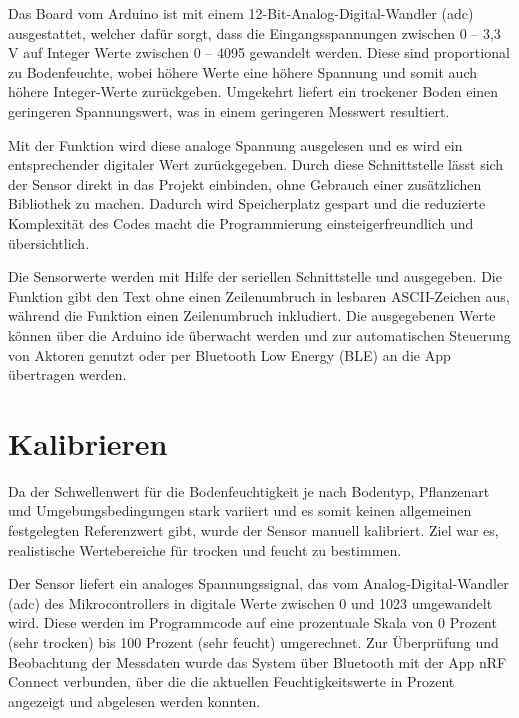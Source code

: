 			\vspace{1\baselineskip}

			Das Board vom Arduino ist mit einem 12-Bit-Analog-Digital-Wandler (\ac{adc}) ausgestattet, welcher dafür sorgt, dass die Eingangsspannungen zwischen 0 – 3,3 V auf Integer Werte zwischen 0 – 4095 gewandelt werden. Diese sind proportional zu Bodenfeuchte, wobei höhere Werte eine höhere Spannung und somit auch höhere Integer-Werte zurückgeben. Umgekehrt liefert ein trockener Boden einen geringeren Spannungswert, was in einem geringeren Messwert resultiert. \cite{Bartlett:2023}

			\vspace{1\baselineskip}

			Mit der Funktion  wird diese analoge Spannung ausgelesen und es wird ein entsprechender digitaler Wert zurückgegeben. Durch diese Schnittstelle lässt sich der Sensor direkt in das Projekt einbinden, ohne Gebrauch einer zusätzlichen Bibliothek zu machen. Dadurch wird Speicherplatz gespart und die reduzierte Komplexität des Codes macht die Programmierung einsteigerfreundlich und übersichtlich. \cite{Bartlett:2023}

			\vspace{1\baselineskip}

			Die Sensorwerte werden mit Hilfe der seriellen Schnittstelle  und  ausgegeben. Die Funktion  gibt den Text ohne einen Zeilenumbruch in lesbaren ASCII-Zeichen aus, während die Funktion  einen Zeilenumbruch inkludiert. Die ausgegebenen Werte können über die Arduino \ac{ide} überwacht werden und zur automatischen Steuerung von Aktoren genutzt oder per Bluetooth Low Energy (BLE) an die App übertragen werden.
			\cite{SunFounder:2025} \cite{Arduino:2024}


	\section{Kalibrieren}
		Da der Schwellenwert für die Bodenfeuchtigkeit je nach Bodentyp, Pflanzenart und Umgebungsbedingungen stark variiert und es somit keinen allgemeinen festgelegten Referenzwert gibt, wurde der Sensor manuell kalibriert. Ziel war es, realistische Wertebereiche für trocken und feucht zu bestimmen.
		
		\vspace{1\baselineskip}
		
		Der Sensor liefert ein analoges Spannungssignal, das vom Analog-Digital-Wandler (\ac{adc}) des Mikrocontrollers in digitale Werte zwischen 0 und 1023 umgewandelt wird. Diese werden im Programmcode auf eine prozentuale Skala von 0 Prozent (sehr trocken) bis 100 Prozent (sehr feucht) umgerechnet. Zur Überprüfung und Beobachtung der Messdaten wurde das System über Bluetooth mit der App nRF Connect verbunden, über die die aktuellen Feuchtigkeitswerte in Prozent angezeigt und abgelesen werden konnten. \cite{Arduino:2024}
		
